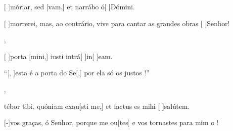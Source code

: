 {  {\item {}[ ]{mó}riar, sed [vam,] et narrábo ó[ ]{Dó}mini.~\Antiphona}%
    {\item {}[ ]{mor}rerei, mas, ao contrário, vive para cantar as grandes obras [ ]{Se}{nhor}!~\Antiphona},
  {\item {}[ ]{por}ta [mini,] iusti intrá[ ]{in}[ ]{e}am.~\Antiphona}%
    {\item {}``[, ]{es}ta é a porta do Se[,] por ela só os justos !''~\Antiphona},
  {\item {}tébor tibi, quóniam exau[sti me,] et factus es mihi [ ]{sa}{lú}tem.~\Antiphona}%
    {\item {}[-]{vos} graças, ó Senhor, porque me ou[tes] e vos tornastes para mim o !~\Antiphona}
}